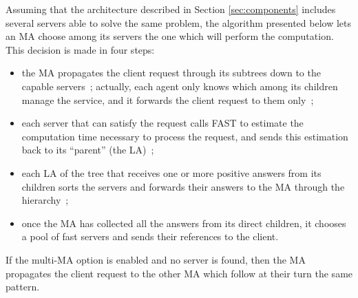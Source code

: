 Assuming that the architecture described in Section
\ref{sec:components} includes several servers able to solve the same
problem, the algorithm presented below lets an MA choose among its
servers the one which will perform the computation. This decision is
made in four steps:




\begin{itemize}
\item the MA propagates the client request through its subtrees down to the
  capable servers~; actually, each agent only knows which among its children manage
  the service, and it forwards the client request to them only~;
\item each server that can satisfy the request calls FAST to estimate the
  computation time necessary to process the request, and sends this
  estimation back to its ``parent'' (the LA)~;
\item each LA of the tree that receives one or more positive answers from its
  children sorts the servers and forwards their answers to the MA through the
  hierarchy~;
\item once the MA has collected all the answers from its direct children, it
  chooses a pool of fast servers and sends their references to the client.
\end{itemize}

If the multi-MA option is enabled and no server is found, then the MA
propagates the client request to the other MA which follow at their turn the
same pattern.


